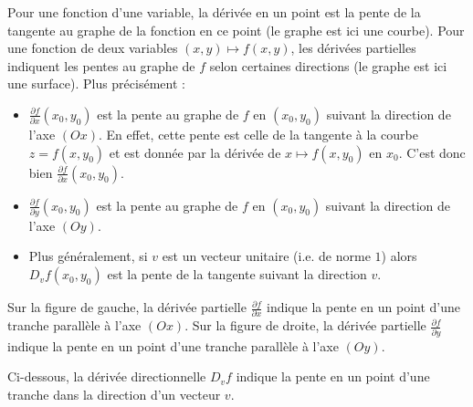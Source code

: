 \documentclass[11pt, class=report,crop=false]{standalone}
\begin{document}
\bigskip
{}

Pour une fonction d'une variable, la dérivée en un point est la pente de la tangente au graphe de la fonction en ce point (le graphe est ici une courbe). Pour une fonction de deux variables $(x,y) \mapsto f(x,y)$, les dérivées partielles indiquent les pentes au graphe de $f$ selon certaines directions (le graphe est ici une surface). Plus précisément :

\begin{itemize}
  \item $\frac{\partial f}{\partial x} (x_0,y_0)$ est la pente au graphe de $f$
 en $(x_0,y_0)$ suivant la direction de l'axe $(Ox)$.
 En effet, cette pente est celle de la tangente à la courbe $z = f(x,y_0)$ et est donnée par la dérivée de $x \mapsto f(x,y_0)$ en $x_0$. C'est donc bien $\frac{\partial f}{\partial x} (x_0,y_0)$.
 
 \item $\frac{\partial f}{\partial y} (x_0,y_0)$ est la pente au graphe de $f$
 en $(x_0,y_0)$ suivant la direction de l'axe $(Oy)$.
 
 \item Plus généralement, si $v$ est un vecteur unitaire (i.e. de norme $1$) alors
 $D_vf(x_0,y_0)$ est la pente de la tangente suivant la direction $v$.
\end{itemize}

 
 
\bigskip 
Sur la figure de gauche, la dérivée partielle  $\frac{\partial f}{\partial x}$ indique la pente en un point d'une tranche parallèle à l'axe $(Ox)$. Sur la figure de droite, la dérivée partielle  $\frac{\partial f}{\partial y}$ indique la pente en un point d'une tranche parallèle à l'axe $(Oy)$.



Ci-dessous, la dérivée directionnelle $D_vf$ indique la pente en un point d'une tranche  dans la direction d'un vecteur $v$.


\bigskip
\end{document}
